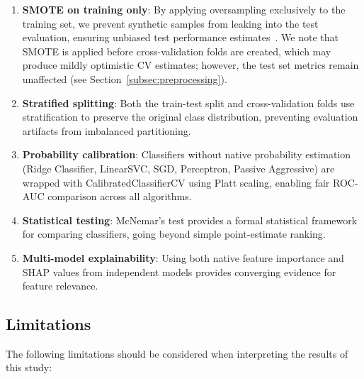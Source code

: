 \documentclass[conference,10pt]{IEEEtran}
\begin{document}
\begin{enumerate}
    \item \textbf{SMOTE on training only}: By applying oversampling exclusively to the training set, we prevent synthetic samples from leaking into the test evaluation, ensuring unbiased test performance estimates~\cite{santos2018cross}. We note that SMOTE is applied before cross-validation folds are created, which may produce mildly optimistic CV estimates; however, the test set metrics remain unaffected (see Section~\ref{subsec:preprocessing}).

    \item \textbf{Stratified splitting}: Both the train-test split and cross-validation folds use stratification to preserve the original class distribution, preventing evaluation artifacts from imbalanced partitioning.

    \item \textbf{Probability calibration}: Classifiers without native probability estimation (Ridge Classifier, LinearSVC, SGD, Perceptron, Passive Aggressive) are wrapped with CalibratedClassifierCV using Platt scaling, enabling fair ROC-AUC comparison across all algorithms.

    \item \textbf{Statistical testing}: McNemar's test provides a formal statistical framework for comparing classifiers, going beyond simple point-estimate ranking.

    \item \textbf{Multi-model explainability}: Using both native feature importance and SHAP values from independent models provides converging evidence for feature relevance.
\end{enumerate}

\subsection{Limitations}

The following limitations should be considered when interpreting the results of this study:
\end{document}
